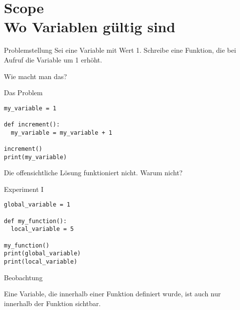 \section{Scope \\ \footnotesize Wo Variablen gültig sind}


\begin{frame}
\begin{block}{Problemstellung}
\vspace{2pt}
Sei  eine Variable mit Wert 1. 
Schreibe eine Funktion, die bei Aufruf die Variable  um 1 erhöht. 

\vspace{8pt}

Wie macht man das? 
\end{block}
\end{frame}

\begin{fragile}
	
\begin{block}{Das Problem}
\vspace{2pt}

\begin{verbatim}
my_variable = 1

def increment(): 
  my_variable = my_variable + 1

increment()
print(my_variable)
\end{verbatim}

\pause 
Die offensichtliche Lösung 
funktioniert nicht. Warum nicht? 
\end{block}
\end{fragile}


\begin{fragile}
	
\begin{block}{Experiment I}
\vspace{2pt}

\begin{verbatim}
global_variable = 1

def my_function(): 
  local_variable = 5

my_function()
print(global_variable)
print(local_variable)
\end{verbatim}


\vspace{12pt}

\end{block}

\begin{exampleblock}{Beobachtung}

\pause 

Eine Variable, die innerhalb einer Funktion definiert wurde, ist auch nur innerhalb der Funktion sichtbar. 
\end{exampleblock}


\end{fragile}

